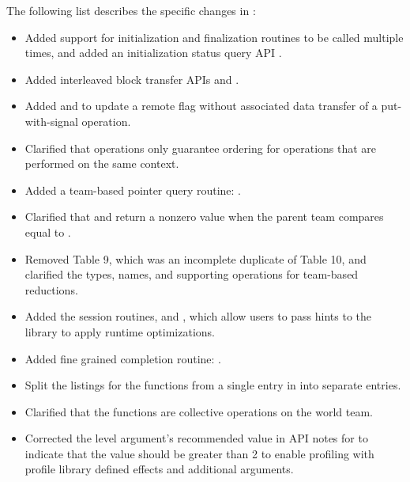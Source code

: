The following list describes the specific changes in \openshmem[1.6]:
\begin{itemize}
%
\item Added support for initialization and finalization routines to be called
    multiple times, and added an initialization status query API
    .
%
%
\item Added interleaved block transfer APIs  and
    .
%
%
\item Added  and  to
  update a remote flag without associated data transfer of a put-with-signal operation.
%
%
\item Clarified that  operations only guarantee ordering for
    operations that are performed on the same context.
%
%
\item Added a team-based pointer query routine:
  .
%
%
\item Clarified that  and
     return a nonzero value when the parent
    team compares equal to .
%
%
\item Removed \openshmem[1.5] Table 9, which was an incomplete duplicate of
    \openshmem[1.5] Table 10, and clarified the types, names, and supporting
    operations for team-based reductions.
%
%
\item Added the session routines,  and
    , which allow users to pass hints to the
    \openshmem library to apply runtime optimizations.
%
\item Added fine grained completion routine: .
%
%
\item Split the listings for the 
  functions from a single entry in \openshmem[1.5] into separate entries.
%
%
\item Clarified that the  functions are collective operations on
    the world team.
%
\item Corrected the level argument's recommended value in API notes for
     to indicate that the value should be greater than
    2 to enable profiling with profile library defined effects and
    additional arguments.
%
\end{itemize}

